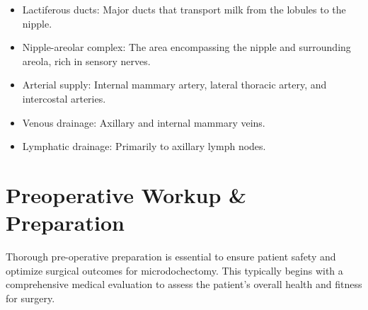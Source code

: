 \begin{itemize}
  \item Lactiferous ducts: Major ducts that transport milk from the lobules to the nipple.
  \item Nipple-areolar complex: The area encompassing the nipple and surrounding areola, rich in sensory nerves.
  \item Arterial supply: Internal mammary artery, lateral thoracic artery, and intercostal arteries.
  \item Venous drainage: Axillary and internal mammary veins.
  \item Lymphatic drainage: Primarily to axillary lymph nodes.
\end{itemize}

\section*{Preoperative Workup \& Preparation}
Thorough pre-operative preparation is essential to ensure patient safety and optimize surgical outcomes for microdochectomy. This typically begins with a comprehensive medical evaluation to assess the patient's overall health and fitness for surgery.

